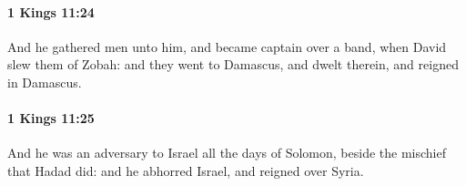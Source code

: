 		\paragraph{1 Kings 11:24} %
			\label{1KINGS-11-24}

			And he gathered men unto him, and became captain over a band, when David slew them of Zobah: and they went to Damascus, and dwelt therein, and reigned in Damascus.


		\paragraph{1 Kings 11:25} %
			\label{1KINGS-11-25}

			And he was an adversary to Israel all the days of Solomon, beside the mischief that Hadad did: and he abhorred Israel, and reigned over Syria.


